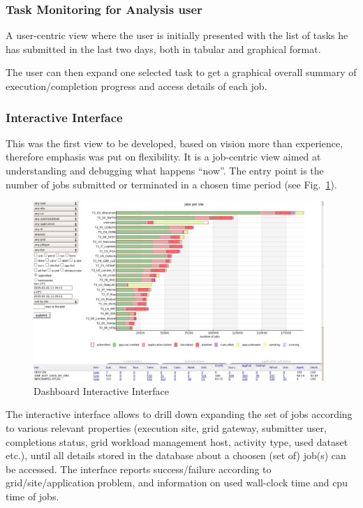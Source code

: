 \subsubsection{Task Monitoring for Analysis user}
A user-centric view where the user is
initially presented with the list of tasks he has submitted in the last
two days, both in tabular and graphical format.%

The user can then expand one selected task to get
a graphical overall summary of execution/completion progress
and access details of each job.%


\subsubsection{Interactive Interface}
This was the first view to be developed, based on
vision more than experience, therefore
emphasis was put on flexibility. It is a job-centric view
aimed at understanding and debugging what happens ``now''.
The entry point is the number of jobs submitted or
terminated in a chosen time period (see Fig.~\ref{fig:Dashboard}).
\begin{figure}
 \includegraphics[width=0.98\textwidth]{DashboardInteractive.eps}
\caption{Dashboard Interactive Interface}
\label{fig:Dashboard}
\end{figure}
The interactive interface allows to drill down expanding the set of jobs according to various relevant properties (execution site, grid gateway,
submitter user, completions status, grid workload management host,
activity type, used dataset etc.), until all details stored in the database
about a choosen (set of) job(s) can be accessed.
The interface reports success/failure according to grid/site/application problem, and information on used wall-clock time and cpu time of jobs.


